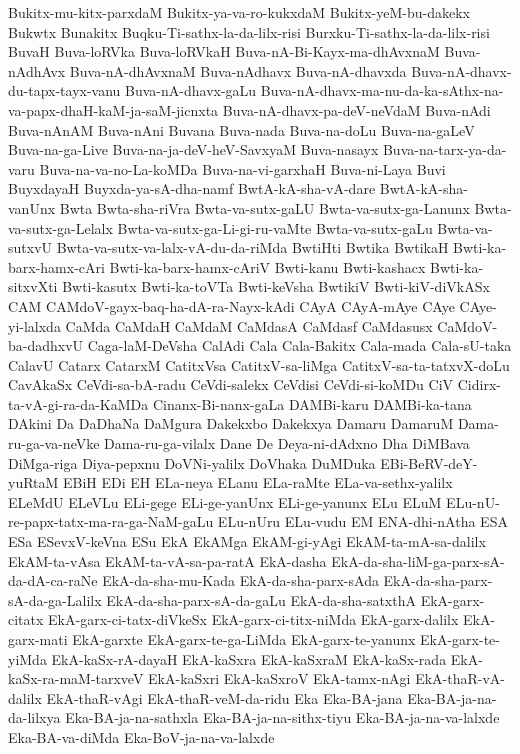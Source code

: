 {Bukitx-mu-kitx-parxdaM
Bukitx-ya-va-ro-kukxdaM
Bukitx-yeM-bu-dakekx
Bukwtx
Bunakitx
Buqku-Ti-sathx-la-da-lilx-risi
Burxku-Ti-sathx-la-da-lilx-risi
BuvaH
Buva-loRVka
Buva-loRVkaH
Buva-nA-Bi-Kayx-ma-dhAvxnaM
Buva-nAdhAvx
Buva-nA-dhAvxnaM
Buva-nAdhavx
Buva-nA-dhavxda
Buva-nA-dhavx-du-tapx-tayx-vanu
Buva-nA-dhavx-gaLu
Buva-nA-dhavx-ma-nu-da-ka-sAthx-na-va-papx-dhaH-kaM-ja-saM-jicnxta
Buva-nA-dhavx-pa-deV-neVdaM
Buva-nAdi
Buva-nAnAM
Buva-nAni
Buvana
Buva-nada
Buva-na-doLu
Buva-na-gaLeV
Buva-na-ga-Live
Buva-na-ja-deV-heV-SavxyaM
Buva-nasayx
Buva-na-tarx-ya-da-varu
Buva-na-va-no-La-koMDa
Buva-na-vi-garxhaH
Buva-ni-Laya
Buvi
BuyxdayaH
Buyxda-ya-sA-dha-namf
BwtA-kA-sha-vA-dare
BwtA-kA-sha-vanUnx
Bwta
Bwta-sha-riVra
Bwta-va-sutx-gaLU
Bwta-va-sutx-ga-Lanunx
Bwta-va-sutx-ga-Lelalx
Bwta-va-sutx-ga-Li-gi-ru-vaMte
Bwta-va-sutx-gaLu
Bwta-va-sutxvU
Bwta-va-sutx-va-lalx-vA-du-da-riMda
BwtiHti
Bwtika
BwtikaH
Bwti-ka-barx-hamx-cAri
Bwti-ka-barx-hamx-cAriV
Bwti-kanu
Bwti-kashacx
Bwti-ka-sitxvXti
Bwti-kasutx
Bwti-ka-toVTa
Bwti-keVsha
BwtikiV
Bwti-kiV-diVkASx
CAM
CAMdoV-gayx-baq-ha-dA-ra-Nayx-kAdi
CAyA
CAyA-mAye
CAye
CAye-yi-lalxda
CaMda
CaMdaH
CaMdaM
CaMdasA
CaMdasf
CaMdasusx
CaMdoV-ba-dadhxvU
Caga-laM-DeVsha
CalAdi
Cala
Cala-Bakitx
Cala-mada
Cala-sU-taka
CalavU
Catarx
CatarxM
CatitxVsa
CatitxV-sa-liMga
CatitxV-sa-ta-tatxvX-doLu
CavAkaSx
CeVdi-sa-bA-radu
CeVdi-salekx
CeVdisi
CeVdi-si-koMDu
CiV
Cidirx-ta-vA-gi-ra-da-KaMDa
Cinanx-Bi-nanx-gaLa
DAMBi-karu
DAMBi-ka-tana
DAkini
Da
DaDhaNa
DaMgura
Dakekxbo
Dakekxya
Damaru
DamaruM
Dama-ru-ga-va-neVke
Dama-ru-ga-vilalx
Dane
De
Deya-ni-dAdxno
Dha
DiMBava
DiMga-riga
Diya-pepxnu
DoVNi-yalilx
DoVhaka
DuMDuka
EBi-BeRV-deY-yuRtaM
EBiH
EDi
EH
ELa-neya
ELanu
ELa-raMte
ELa-va-sethx-yalilx
ELeMdU
ELeVLu
ELi-gege
ELi-ge-yanUnx
ELi-ge-yanunx
ELu
ELuM
ELu-nU-re-papx-tatx-ma-ra-ga-NaM-gaLu
ELu-nUru
ELu-vudu
EM
ENA-dhi-nAtha
ESA
ESa
ESevxV-keVna
ESu
EkA
EkAMga
EkAM-gi-yAgi
EkAM-ta-mA-sa-dalilx
EkAM-ta-vAsa
EkAM-ta-vA-sa-pa-ratA
EkA-dasha
EkA-da-sha-liM-ga-parx-sA-da-dA-ca-raNe
EkA-da-sha-mu-Kada
EkA-da-sha-parx-sAda
EkA-da-sha-parx-sA-da-ga-Lalilx
EkA-da-sha-parx-sA-da-gaLu
EkA-da-sha-satxthA
EkA-garx-citatx
EkA-garx-ci-tatx-diVkeSx
EkA-garx-ci-titx-niMda
EkA-garx-dalilx
EkA-garx-mati
EkA-garxte
EkA-garx-te-ga-LiMda
EkA-garx-te-yanunx
EkA-garx-te-yiMda
EkA-kaSx-rA-dayaH
EkA-kaSxra
EkA-kaSxraM
EkA-kaSx-rada
EkA-kaSx-ra-maM-tarxveV
EkA-kaSxri
EkA-kaSxroV
EkA-tamx-nAgi
EkA-thaR-vA-dalilx
EkA-thaR-vAgi
EkA-thaR-veM-da-ridu
Eka
Eka-BA-jana
Eka-BA-ja-na-da-lilxya
Eka-BA-ja-na-sathxla
Eka-BA-ja-na-sithx-tiyu
Eka-BA-ja-na-va-lalxde
Eka-BA-va-diMda
Eka-BoV-ja-na-va-lalxde
}
